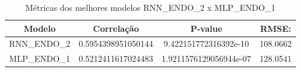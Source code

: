             \begin{table}[!ht]
            \centering
            \begin{tabular}{|c|c|c|c|}
            \rowcolor{gray!50}
            \hline
                Modelo &  Correlação & P-value & RMSE: \\ \hline
                RNN\_ENDO\_2 & 0.5954398951050144 & 9.422151772316392e-10 & 108.0662\\ 
                 MLP\_ENDO\_1 & 0.5212411617024483 & 1.9211576129056944e-07 & 128.0541\\
            \hline 
            \end{tabular}
            \caption{Métricas dos melhores modelos RNN\_ENDO\_2 x MLP\_ENDO\_1}
            \label{table:case1_GRUvsMLP}
            \end{table}
            
            {\begin{center} \begin{minipage}[b]{1.0\textwidth}
            \begin{figure}[H]
            \end{figure}\end{minipage} \hfill %
                      \begin{minipage}[b]{1.0\textwidth}
            \begin{figure}[H]
            \end{figure} \end{minipage} \end{center} }
            
